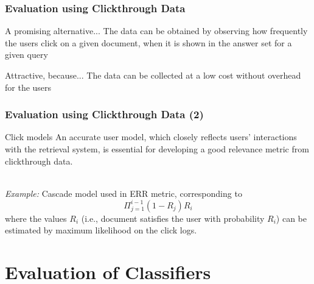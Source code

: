 \documentclass[svgnames]{beamer}
\begin{document}
\begin{frame}
  \frametitle{Evaluation using Clickthrough Data}

\begin{block}{A promising alternative...}
The data can be obtained by observing how frequently the users click on a given document, when it is shown in the answer set for a given query
\end{block}

\begin{block}{Attractive, because...}
The data can be collected at a low cost without overhead for the users
\end{block}
\end{frame}

\begin{frame} \frametitle{Evaluation using Clickthrough Data (2)}
\begin{block}{Click models}
An accurate user model, which closely reflects users’ interactions with the retrieval system, is essential for developing a good relevance metric from clickthrough data.

~\\
\emph{Example:} Cascade model used in ERR metric, corresponding to
\begin{displaymath}
\Pi_{j=1}^{i-1}(1 - R_j) R_i
\end{displaymath}
where the values $R_i$ (i.e., document satisfies the user with probability $R_i$) can be estimated by maximum likelihood on the click logs.
\end{block}
\end{frame}


\section{Evaluation of Classifiers}
\end{document}
